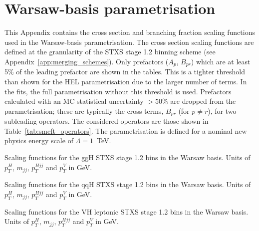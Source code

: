 \chapter{Warsaw-basis parametrisation}\label{app:smeft_parametrisation}

This Appendix contains the cross section and branching fraction scaling functions used in the Warsaw-basis parametrisation. The cross section scaling functions are defined at the granularity of the STXS stage 1.2 binning scheme (see Appendix~\ref{app:merging_schemes}). Only prefactors ($A_p$, $B_{pr}$) which are at least 5\% of the leading prefactor are shown in the tables. This is a tighter threshold than shown for the HEL parametrisation due to the larger number of terms. In the fits, the full parametrisation without this threshold is used. Prefactors calculated with an MC statistical uncertainty $>50\%$ are dropped from the parametrisation; these are typically the cross terms, $B_{pr}$ (for $p \neq r$), for two subleading operators. The considered operators are those shown in Table~\ref{tab:smeft_operators}. The parametrisation is defined for a nominal new physics energy scale of $\Lambda = 1$~TeV. 

\begin{table}
  \centering
  \tiny
  \renewcommand{\arraystretch}{1.8}
  \setlength{\tabcolsep}{6pt}
  \caption[Warsaw: Scaling functions for the ggH STXS stage 1.2 bins]
  {
    Scaling functions for the ggH STXS stage 1.2 bins in the Warsaw basis. Units of $p_T^H$, $m_{jj}$, $p_T^{Hjj}$ and $p_T^V$ in GeV.
  }
  \label{tab:warsaw_parametrisation_a}
  \hspace*{-2cm}
  
  \hspace*{-2cm}
\end{table}

\begin{table}[htb!]
  \centering
  \tiny
  \renewcommand{\arraystretch}{2.5}
  \setlength{\tabcolsep}{6pt}
  \caption[Warsaw: Scaling functions for the qqH STXS stage 1.2 bins]
  {
    Scaling functions for the qqH STXS stage 1.2 bins in the Warsaw basis. Units of $p_T^H$, $m_{jj}$, $p_T^{Hjj}$ and $p_T^V$ in GeV.
  }
  \label{tab:warsaw_parametrisation_b}
  \hspace*{-2cm}
  
  \hspace*{-2cm}
\end{table}

\begin{table}[htb!]
  \centering
  \tiny
  \renewcommand{\arraystretch}{3}
  \setlength{\tabcolsep}{6pt}
  \caption[Warsaw: Scaling functions for the VH leptonic STXS stage 1.2 bins]
  {
    Scaling functions for the VH leptonic STXS stage 1.2 bins in the Warsaw basis. Units of $p_T^H$, $m_{jj}$, $p_T^{Hjj}$ and $p_T^V$ in GeV.
  }
  \label{tab:warsaw_parametrisation_c}
  \hspace*{-2cm}
  
  \hspace*{-2cm}
\end{table}

